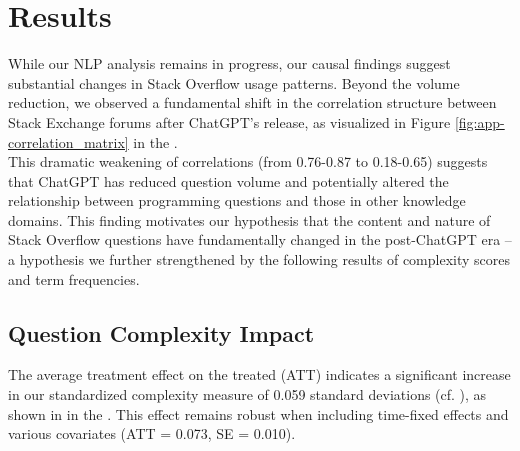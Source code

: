 \section{Results}
While our NLP analysis remains in progress, our causal findings suggest substantial changes in Stack Overflow usage patterns. Beyond the volume reduction, we observed a fundamental shift in the correlation structure between Stack Exchange forums after ChatGPT's release, as visualized in Figure \ref{fig:app-correlation_matrix} in the .\\

This dramatic weakening of correlations (from 0.76-0.87 to 0.18-0.65) suggests that ChatGPT has reduced question volume and potentially altered the relationship between programming questions and those in other knowledge domains. This finding motivates our hypothesis that the content and nature of Stack Overflow questions have fundamentally changed in the post-ChatGPT era -- a hypothesis we further strengthened by the following results of complexity scores and term frequencies.


\subsection{Question Complexity Impact}

The average treatment effect on the treated (ATT) indicates a significant increase in our standardized complexity measure of 0.059 standard deviations (cf. ), as shown in  in the . This effect remains robust when including time-fixed effects and various covariates (ATT = 0.073, SE = 0.010).  

